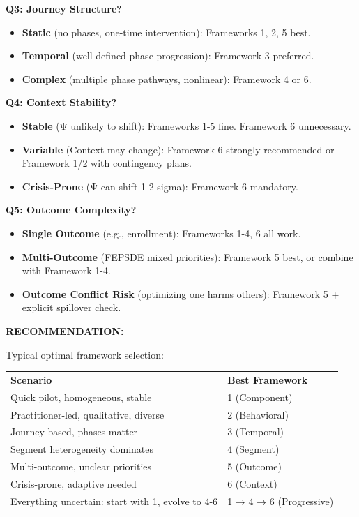 \begin{center}
{\begin{minipage}{14cm}
\vspace{0.3cm}
\textbf{Q3: Journey Structure?}

\begin{itemize}[noitemsep]
\item \textbf{Static} (no phases, one-time intervention): Frameworks 1, 2, 5 best.
\item \textbf{Temporal} (well-defined phase progression): Framework 3 preferred.
\item \textbf{Complex} (multiple phase pathways, nonlinear): Framework 4 or 6.
\end{itemize}

\vspace{0.3cm}
\textbf{Q4: Context Stability?}

\begin{itemize}[noitemsep]
\item \textbf{Stable} (Ψ unlikely to shift): Frameworks 1-5 fine. Framework 6 unnecessary.
\item \textbf{Variable} (Context may change): Framework 6 strongly recommended or Framework 1/2 with contingency plans.
\item \textbf{Crisis-Prone} (Ψ can shift 1-2 sigma): Framework 6 mandatory.
\end{itemize}

\vspace{0.3cm}
\textbf{Q5: Outcome Complexity?}

\begin{itemize}[noitemsep]
\item \textbf{Single Outcome} (e.g., enrollment): Frameworks 1-4, 6 all work.
\item \textbf{Multi-Outcome} (FEPSDE mixed priorities): Framework 5 best, or combine with Framework 1-4.
\item \textbf{Outcome Conflict Risk} (optimizing one harms others): Framework 5 + explicit spillover check.
\end{itemize}

\vspace{0.3cm}
\textbf{RECOMMENDATION:}

Typical optimal framework selection:

\begin{tabular}{@{}ll@{}}
\textbf{Scenario} & \textbf{Best Framework} \\
Quick pilot, homogeneous, stable & 1 (Component) \\
Practitioner-led, qualitative, diverse & 2 (Behavioral) \\
Journey-based, phases matter & 3 (Temporal) \\
Segment heterogeneity dominates & 4 (Segment) \\
Multi-outcome, unclear priorities & 5 (Outcome) \\
Crisis-prone, adaptive needed & 6 (Context) \\
Everything uncertain: start with 1, evolve to 4-6 & 1 → 4 → 6 (Progressive)
\end{tabular}


\end{minipage}}
\end{center}
